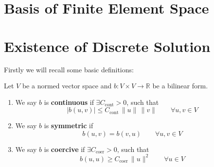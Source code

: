 \section{Basis of Finite Element Space}
\section{Existence of Discrete Solution}
\label{sec:existence_uniqueness_elliptic_discrete_problem}
Firstly we will recall some basic definitions:
\begin{definition} Let $V$ be a normed vector space and $b:V\times V \to \mathbb{R}$
    be a bilinear form.
    \begin{enumerate}[label=\textnormal{(\roman*)}]
        \item We say $b$ is \textbf{continuous} if $\exists C_{\text{cont}}>0$, such that
        \[
            |b(u,v)|\leq C_{\text{cont}}\, \|u\|\, \|v\| \qquad \forall u,v \in V
        \]
        \item We say $b$ is \textbf{symmetric} if 
        \[  
            b(u,v) = b(v,u) \qquad \forall u,v \in V
        \]
        \item We say $b$ is \textbf{coercive} if $\exists C_{\text{coer}}>0$, such that
        \[
            b(u,u)\geq C_{\text{coer}}\, \|u\|^2 \qquad \forall u \in V
        \]
    \end{enumerate}
    
\end{definition}


